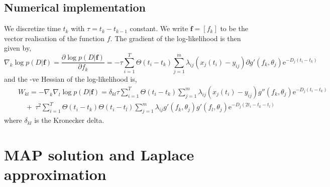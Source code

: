 \documentclass[10pt]{article}
\begin{document}
\subsection{Numerical implementation}

We discretize time $t_k$ with $\tau = t_{k}-t_{k-1}$ constant. We
write $\bm f=[f_k]$ to be the vector realisation of the function
$f$. The gradient of the log-likelihood is then given by,
\begin{equation}
\nabla_k \log p(D|\bm f) = \frac{\partial \log p(D|\bm f)}{\partial f_k} = -\tau\sum_{i=1}^T \Theta(t_i - t_k)\sum_{j=1}^m \lambda_{ij} 
(x_j(t_i) - y_{ij})\partial g'(f_k,\theta_j) \mathrm{e}^{-D_j(t_i-t_k)}
\end{equation}
and the -ve Hessian of the log-likelihood is,
\begin{eqnarray}
& & W_{kl} = -\nabla_k \nabla_l \log p(D|\bm f) = \delta_{kl} \tau \sum_{i=1}^T
\Theta(t_i-t_k)\sum_{j=1}^m \lambda_{ij}(x_j(t_i) - y_{ij})
g''(f_k,\theta_j)
 \mathrm{e}^{-D_j(t_i-t_k)}     \nonumber \\
& & \quad + \: \tau^2\sum_{i=1}^T \Theta(t_i-t_k)\Theta(t_i-t_l)\sum_{j=1}^m \lambda_{ij} 
g'(f_k,\theta_j) g'(f_l,\theta_j)
\mathrm{e}^{-D_j(2t_i-t_k-t_l)} 
\end{eqnarray}
where $\delta_{kl}$ is the Kronecker delta.

\section{MAP solution and Laplace approximation}
\end{document}
